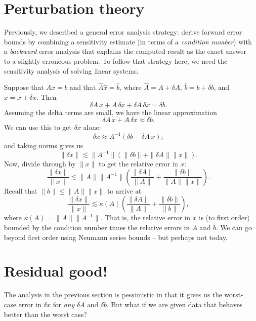 \documentclass[12pt, leqno]{article}
\begin{document}
\section{Perturbation theory}

Previously, we described a general error analysis strategy: derive
forward error bounds by combining a sensitivity estimate (in terms of
a {\em condition number}) with a {\em backward} error analysis that
explains the computed result as the exact answer to a slightly
erroneous problem.  To follow that strategy here, we need the
sensitivity analysis of solving linear systems.

Suppose that $Ax = b$ and that $\hat{A} \hat{x} = \hat{b}$,
where $\hat{A} = A + \delta A$, $\hat{b} = b + \delta b$,
and $\hat{x} = x + \delta x$.  Then
\[
  \delta A \, x + A \, \delta x + \delta A \, \delta x = \delta b.
\]
Assuming the delta terms are small, we have the linear approximation
\[
  \delta A \, x + A \, \delta x \approx \delta b.
\]
We can use this to get $\delta x$ alone:
\[
  \delta x \approx A^{-1} (\delta b - \delta A \, x);
\]
and taking norms gives us
\[
  \|\delta x\| \lesssim \|A^{-1}\| (\|\delta b\| + \|\delta A\| \|x\|).
\]
Now, divide through by $\|x\|$ to get the relative error in $x$:
\[
  \frac{\|\delta x\|}{\|x\|} \lesssim \|A\| \|A^{-1}\|
    \left( \frac{\|\delta A\|}{\|A\|} + \frac{\|\delta b\|}{\|A\|\|x\|} \right).
\]
Recall that $\|b\| \leq \|A\|\|x\|$ to arrive at
\[
  \frac{\|\delta x\|}{\|x\|} \lesssim \kappa(A)
    \left( \frac{\|\delta A\|}{\|A\|} + \frac{\|\delta b\|}{\|b\|} \right),
\]
where $\kappa(A) = \|A\| \|A^{-1}\|$.  That is, the relative error in
$x$ is (to first order) bounded by the condition number times the relative
errors in $A$ and $b$.  We can go beyond first order using Neumann
series bounds -- but perhaps not today.

\section{Residual good!}

The analysis in the previous section is pessimistic in that it gives us
the worst-case error in $\delta x$ for {\em any} $\delta A$ and $\delta b$.
But what if we are given data that behaves better than the worst case?
\end{document}
